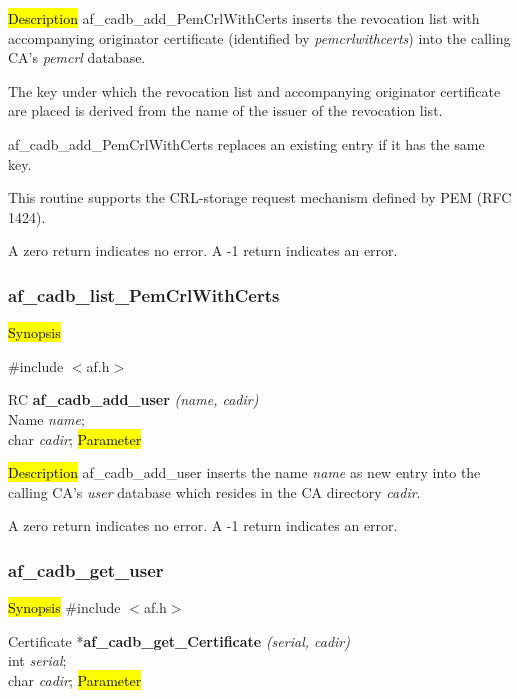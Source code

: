 \hl{Description}
af\_cadb\_add\_PemCrlWithCerts inserts the revocation list with accompanying originator certificate
(identified by {\em pemcrlwithcerts}) into the calling CA's {\em pemcrl} database. 

The key under which the revocation list and accompanying originator certificate are placed is derived 
from the name of the issuer of the revocation list.

af\_cadb\_add\_PemCrlWithCerts replaces an existing entry if it has the same key.

This routine supports the CRL-storage request mechanism defined by PEM (RFC 1424).

A  zero return indicates no error.
A -1 return indicates an error.




\subsubsection{af\_cadb\_list\_PemCrlWithCerts}
\label{af_cadb_add_user}

\hl{Synopsis}

\#include $<$af.h$>$

RC {\bf af\_cadb\_add\_user} {\em (name, cadir)} \\
Name {\em *name}; \\
char {\em *cadir};
\hl{Parameter}


\hl{Description}
af\_cadb\_add\_user inserts the name {\em name} as new entry into the calling CA's {\em user} 
database which resides in the CA directory {\em cadir}.

A  zero return indicates no error.
A -1 return indicates an error.



\subsubsection{af\_cadb\_get\_user}
\label{af_cadb_get_Certificate}
\hl{Synopsis}
\#include $<$af.h$>$

Certificate *{\bf af\_cadb\_get\_Certificate} {\em (serial, cadir)} \\
int  {\em serial}; \\
char {\em *cadir};
\hl{Parameter}

